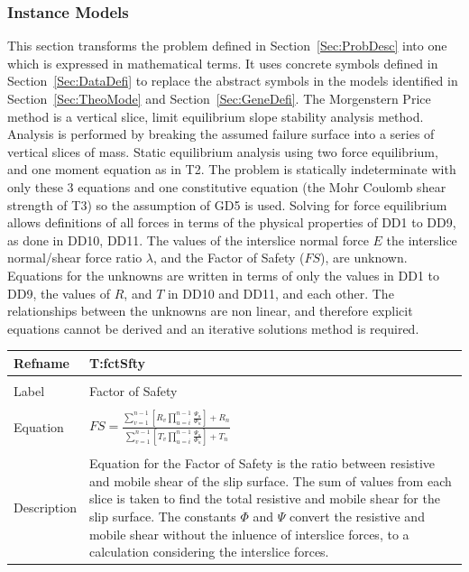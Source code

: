 \documentclass[12pt]{article}
\begin{document}
\subsubsection{Instance Models}
\label{Sec:InstMode}
This section transforms the problem defined in Section~\ref{Sec:ProbDesc} into one which is expressed in mathematical terms. It uses concrete symbols defined in Section~\ref{Sec:DataDefi} to replace the abstract symbols in the models identified in Section~\ref{Sec:TheoMode} and Section~\ref{Sec:GeneDefi}.
The Morgenstern Price method is a vertical slice, limit equilibrium slope stability analysis method. Analysis is performed by breaking the assumed failure surface into a series of vertical slices of mass. Static equilibrium analysis using two force equilibrium, and one moment equation as in T2. The problem is statically indeterminate with only these 3 equations and one constitutive equation (the Mohr Coulomb shear strength of T3) so the assumption of GD5 is used. Solving for force equilibrium allows definitions of all forces in terms of the physical properties of DD1 to DD9, as done in DD10, DD11.
The values of the interslice normal force $E$ the interslice normal/shear force ratio $\lambda{}$, and the Factor of Safety ($FS$), are unknown. Equations for the unknowns are written in terms of only the values in DD1 to DD9, the values of $R$, and $T$ in DD10 and DD11, and each other. The relationships between the unknowns are non linear, and therefore explicit equations cannot be derived and an iterative solutions method is required.
~\newline
\noindent \begin{minipage}{\textwidth}
\begin{tabular}{p{} p{}}
\toprule \textbf{Refname} & \textbf{T:fctSfty}
\label{T:fctSfty}
\\ \midrule \\
Label & Factor of Safety
\\ \midrule \\
Equation & $FS=\frac{\displaystyle\sum_{v=1}^{n-1}{\left[R_{v} \displaystyle\prod_{u=i}^{n-1}{\frac{\Psi{}_{u}}{\Phi{}_{u}}}\right]}+R_{n}}{\displaystyle\sum_{v=1}^{n-1}{\left[T_{v} \displaystyle\prod_{u=i}^{n-1}{\frac{\Psi{}_{u}}{\Phi{}_{u}}}\right]}+T_{n}}$
\\ \midrule \\
Description & Equation for the Factor of Safety is the ratio between resistive and mobile shear of the slip surface. The sum of values from each slice is taken to find the total resistive and mobile shear for the slip surface. The constants $\Phi{}$ and $\Psi{}$ convert the resistive and mobile shear without the inluence of interslice forces, to a calculation considering the interslice forces.
\\ \bottomrule \end{tabular}
\end{minipage}\\
\end{document}
